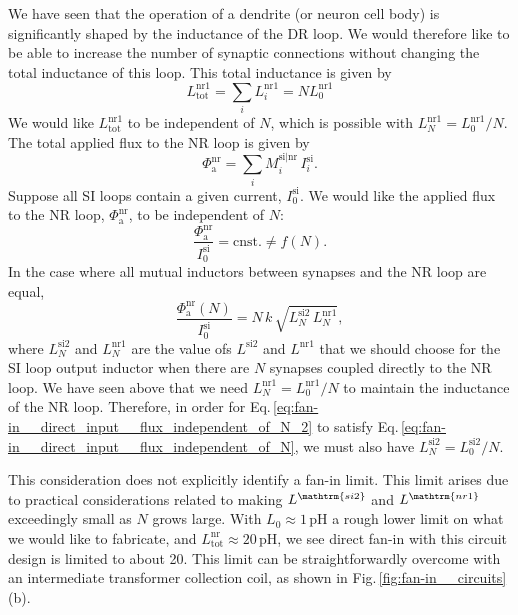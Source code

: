 \documentclass[twocolumn]{article}
\begin{document}
We have seen that the operation of a dendrite (or neuron cell body) is significantly shaped by the inductance of the DR loop. We would therefore like to be able to increase the number of synaptic connections without changing the total inductance of this loop. This total inductance is given by
\begin{equation}
\label{eq:fan-in__direct_input__si_inductance}
L^{\mathrm{nr1}}_{\mathrm{tot}} = \sum_i L^{\mathrm{nr1}}_i = N L^{\mathrm{nr1}}_0
\end{equation}
We would like $L^{\mathrm{nr1}}_{\mathrm{tot}}$ to be independent of $N$, which is possible with $L^{\mathrm{nr1}}_N = L^{\mathrm{nr1}}_0/N$. The total applied flux to the NR loop is given by
\begin{equation}
\label{eq:fan-in__direct_input__applied_flux}
\Phi_{\mathrm{a}}^{\mathrm{nr}} = \sum_i M_i^{\mathrm{si|nr}} \, I_i^{\mathrm{si}}.
\end{equation}
Suppose all SI loops contain a given current, $I_0^{\mathrm{si}}$. We would like the applied flux to the NR loop, $\Phi_{\mathrm{a}}^{\mathrm{nr}}$, to be independent of $N$:
\begin{equation}
\label{eq:fan-in__direct_input__flux_independent_of_N}
\frac{ \Phi_{\mathrm{a}}^{\mathrm{nr}} }{ I_0^{\mathrm{si}} } = \mathrm{cnst.} \neq f(N).
\end{equation}
In the case where all mutual inductors between synapses and the NR loop are equal,
\begin{equation}
\label{eq:fan-in__direct_input__flux_independent_of_N_2}
\frac{ \Phi_{\mathrm{a}}^{\mathrm{nr}}(N) }{ I_0^{\mathrm{si}} } = N\,k\,\sqrt{ L_N^{\mathrm{si2}} \, L_N^{\mathrm{nr1}}},
\end{equation}
where $L_N^{\mathrm{si2}}$ and $L_N^{\mathrm{nr1}}$ are the value ofs $L^{\mathrm{si2}}$ and $L^{\mathrm{nr1}}$ that we should choose for the SI loop output inductor when there are $N$ synapses coupled directly to the NR loop. We have seen above that we need $L_N^{\mathrm{nr1}} = L_0^{\mathrm{nr1}}/N$ to maintain the inductance of the NR loop. Therefore, in order for Eq.\,\ref{eq:fan-in__direct_input__flux_independent_of_N_2} to satisfy Eq.\,\ref{eq:fan-in__direct_input__flux_independent_of_N}, we must also have $L_N^{\mathrm{si2}} = L_0^{\mathrm{si2}}/N$.

This consideration does not explicitly identify a fan-in limit. This limit arises due to practical considerations related to making $L^{\mathtrm{si2}}$ and $L^{\mathtrm{nr1}}$ exceedingly small as $N$ grows large. With $L_0 \approx 1$\,pH a rough lower limit on what we would like to fabricate, and $L_{\mathrm{tot}}^{\mathrm{nr}} \approx 20$\,pH, we see direct fan-in with this circuit design is limited to about 20. This limit can be straightforwardly overcome with an intermediate transformer collection coil, as shown in Fig.\,\ref{fig:fan-in__circuits}(b).
\end{document}

